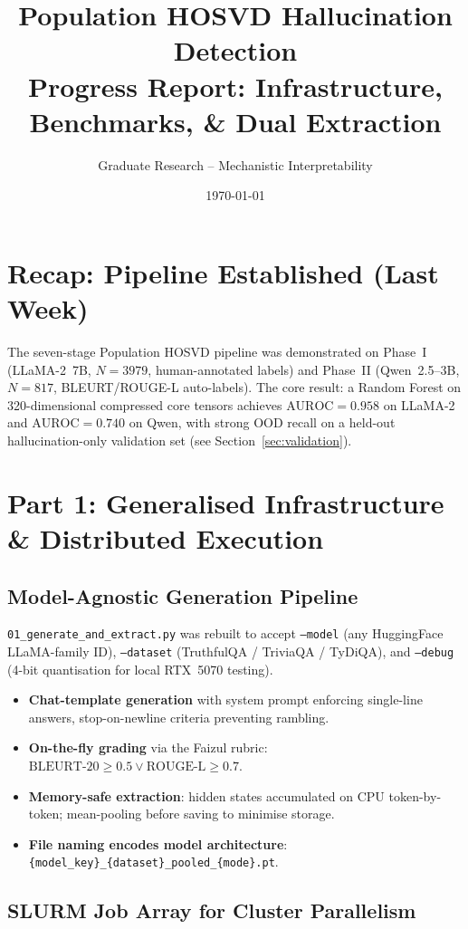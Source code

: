 \documentclass[11pt,a4paper]{article}
\title{Population HOSVD Hallucination Detection\\
       \large Progress Report: Infrastructure, Benchmarks, \& Dual Extraction}
\author{Graduate Research -- Mechanistic Interpretability}
\date{\today}
\begin{document}
\maketitle

\section{Recap: Pipeline Established (Last Week)}

The seven-stage Population HOSVD pipeline was demonstrated on Phase~I
(LLaMA-2~7B, $N=3979$, human-annotated labels) and Phase~II (Qwen~2.5--3B,
$N=817$, BLEURT/ROUGE-L auto-labels).  The core result: a Random Forest on
320-dimensional compressed core tensors achieves $\text{AUROC} = 0.958$ on
LLaMA-2 and $\text{AUROC} = 0.740$ on Qwen, with strong OOD recall on a
held-out hallucination-only validation set (see Section~\ref{sec:validation}).

\section{Part 1: Generalised Infrastructure \& Distributed Execution}

\subsection{Model-Agnostic Generation Pipeline}

\texttt{01\_generate\_and\_extract.py} was rebuilt to accept \texttt{--model}
(any HuggingFace LLaMA-family ID), \texttt{--dataset} (TruthfulQA / TriviaQA /
TyDiQA), and \texttt{--debug} (4-bit quantisation for local RTX~5070 testing).

\begin{itemize}
  \item \textbf{Chat-template generation} with system prompt enforcing
        single-line answers, stop-on-newline criteria preventing rambling.
  \item \textbf{On-the-fly grading} via the Faizul rubric:
        $\text{BLEURT-20} \ge 0.5 \lor \text{ROUGE-L} \ge 0.7$.
  \item \textbf{Memory-safe extraction}: hidden states accumulated on CPU
        token-by-token; mean-pooling before saving to minimise storage.
  \item \textbf{File naming encodes model architecture}:
        \texttt{\{model\_key\}\_\{dataset\}\_pooled\_\{mode\}.pt}.
\end{itemize}

\subsection{SLURM Job Array for Cluster Parallelism}
\end{document}
